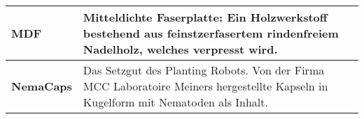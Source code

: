 \begin{table}[H]
\begin{tabular}{|L{4.5cm}|L{11cm}|}
		\hline
		\textbf{MDF} &  Mitteldichte Faserplatte: Ein Holzwerkstoff bestehend aus feinstzerfasertem rindenfreiem Nadelholz, welches verpresst wird.  \\		
		
		\hline
		\textbf{NemaCaps} &  Das Setzgut des Planting Robots. Von der Firma MCC Laboratoire Meiners hergestellte Kapseln in Kugelform mit Nematoden als Inhalt. \\
		
		\hline
	\end{tabular} 
	\vspace{0.2cm}
\end{table}


